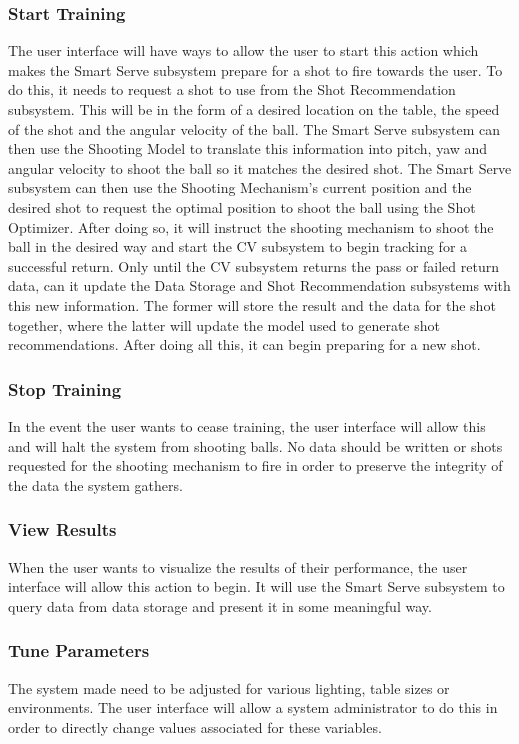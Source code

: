 \documentclass[11pt]{article}
\begin{document}
\subsubsection*{Start Training}
The user interface will have ways to allow the user to start this action which makes the Smart Serve subsystem prepare for a shot to fire towards the user. To do this, it needs to request a shot to use from the Shot Recommendation subsystem. This will be in the form of a desired location on the table, the speed of the shot and the angular velocity of the ball. The Smart Serve subsystem can then use the Shooting Model to translate this information into pitch, yaw and angular velocity to shoot the ball so it matches the desired shot. The Smart Serve subsystem can then use the Shooting Mechanism's current position and the desired shot to request the optimal position to shoot the ball using the Shot Optimizer. After doing so, it will instruct the shooting mechanism to shoot the ball in the desired way and start the CV subsystem to begin tracking for a successful return. Only until the CV subsystem returns the pass or failed return data, can it update the Data Storage and Shot Recommendation subsystems with this new information. The former will store the result and the data for the shot together, where the latter will update the model used to generate shot recommendations. After doing all this, it can begin preparing for a new shot.
\subsubsection*{Stop Training}
In the event the user wants to cease training, the user interface will allow this and will halt the system from shooting balls. No data should be written or shots requested for the shooting mechanism to fire in order to preserve the integrity of the data the system gathers.
\subsubsection*{View Results}
When the user wants to visualize the results of their performance, the user interface will allow this action to begin. It will use the Smart Serve subsystem to query data from data storage and present it in some meaningful way.
\subsubsection*{Tune Parameters}
The system made need to be adjusted for various lighting, table sizes or environments. The user interface will allow a system administrator to do this in order to directly change values associated for these variables.
\end{document}
